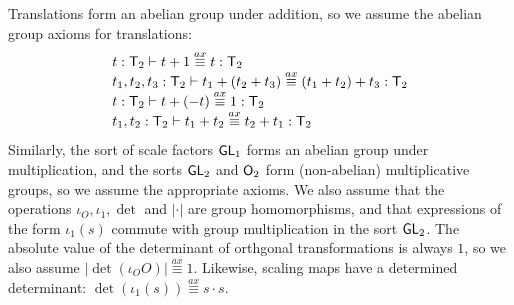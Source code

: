 \begin{example}
  Translations form an abelian group under addition, so we assume the
  abelian group axioms for translations:
  \begin{displaymath}
    \begin{array}{l}
      t : \mathsf{T}_2 \vdash t + 1 \stackrel{ax}\equiv t : \mathsf{T}_2 \\
      t_1, t_2, t_3 : \mathsf{T}_2 \vdash t_1 + (t_2 + t_3) \stackrel{ax}\equiv (t_1 + t_2) + t_3 : \mathsf{T}_2 \\
      t : \mathsf{T}_2 \vdash t + (-t) \stackrel{ax}\equiv 1 : \mathsf{T}_2 \\
      t_1, t_2 : \mathsf{T}_2 \vdash t_1 + t_2 \stackrel{ax}\equiv t_2 + t_1 : \mathsf{T}_2 \\
    \end{array}
  \end{displaymath}
  Similarly, the sort of scale factors $\mathsf{GL}_1$ forms an abelian
  group under multiplication, and the sorts $\mathsf{GL}_2$ and
  $\mathsf{O}_2$ form (non-abelian) multiplicative groups, so we assume
  the appropriate axioms. We also assume that the operations $\iota_O,
  \iota_1, \det$ and $|\cdot|$ are group homomorphisms, and that
  expressions of the form $\iota_1(s)$ commute with group
  multiplication in the sort $\mathsf{GL}_2$. The absolute value of the
  determinant of orthgonal transformations is always $1$, so we also
  assume $|\det(\iota_OO)| \stackrel{ax}\equiv 1$. Likewise, scaling
  maps have a determined determinant: $\det(\iota_1(s))
  \stackrel{ax}\equiv s \cdot s$.
\end{example}



